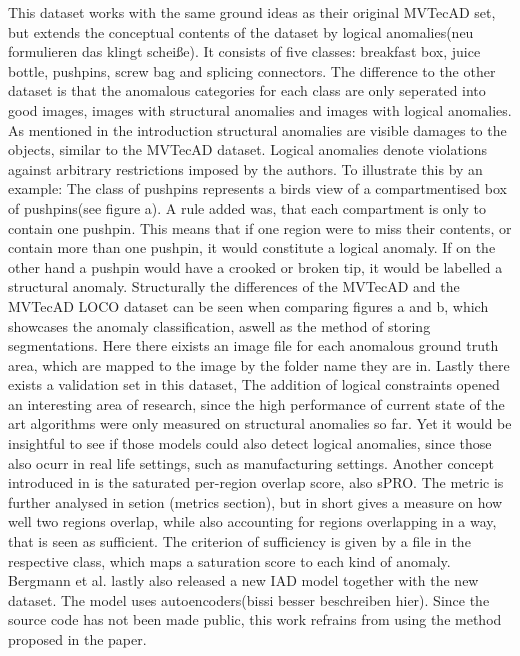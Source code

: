 This dataset works with the same ground ideas as their original MVTecAD set, but extends the conceptual contents of the dataset by logical anomalies(neu formulieren das klingt scheiße). 
It consists of five classes: breakfast box, juice bottle, pushpins, screw bag and splicing connectors. The difference to the other dataset is that the anomalous categories for each class are only seperated into good images, images with structural anomalies 
and images with logical anomalies. As mentioned in the introduction structural anomalies are visible damages to the objects, similar to the MVTecAD dataset. Logical anomalies denote violations against arbitrary restrictions 
imposed by the authors. To illustrate this by an example: The class of pushpins represents a birds view of a compartmentised box of pushpins(see figure a). A rule added was, 
that each compartment is only to contain one pushpin. This means that if one region were to miss their contents, or contain more than one pushpin, it would constitute a logical anomaly. If on the 
other hand a pushpin would have a crooked or broken tip, it would be  labelled a structural anomaly. Structurally the differences of the 
MVTecAD and the MVTecAD LOCO dataset can be seen when comparing figures a and b, which showcases the anomaly classification, aswell as 
the method of storing segmentations. Here there eixists an image file for each anomalous ground truth area, which are mapped to the image 
by the folder name they are in. Lastly there exists a validation set in this dataset,
\newline
The addition of logical constraints opened an interesting area of research, since the high performance 
of current state of the art algorithms were only measured on structural anomalies so far. Yet it would be insightful to see if those models could also detect logical anomalies, since those also ocurr 
in real life settings, such as manufacturing settings. Another concept introduced in \cite{LOCODentsAndScratchesBergmann2022} is the 
saturated per-region overlap score, also sPRO. The metric is further analysed in setion (metrics section), but in short gives a measure 
on how well two regions overlap, while also accounting for regions overlapping in a way, that is seen as sufficient. The criterion of 
sufficiency is given by a file in the respective class, which maps a saturation score to each kind of anomaly.
Bergmann et al.\cite{LOCODentsAndScratchesBergmann2022} lastly also released a new IAD model together with the new dataset. The model uses autoencoders(bissi besser beschreiben hier). Since the source code has not been made public, 
this work refrains from using the method proposed in the paper.


